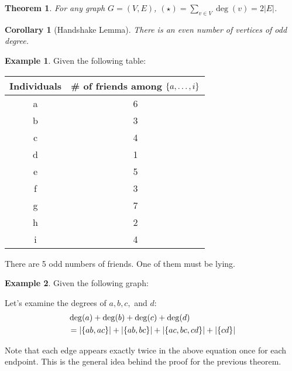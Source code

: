 \documentclass[]{article}
\newtheorem*{theorem}{Theorem}
\newtheorem*{corollary}{Corollary}
\theoremstyle{definition}
\newtheorem{ex}{Example}[section]
\newcommand{\lecture}[1]{\marginpar{{\footnotesize $\leftarrow$ \underline{#1}}}}
\DeclarePairedDelimiter{\set}{\lbrace}{\rbrace}
\begin{document}
			\begin{theorem}
				For any graph $G = (V, E)$, $(\star) = \displaystyle \sum_{v \in V} \deg(v) = 2|E|$.
			\end{theorem}

			\begin{corollary}[Handshake Lemma]
				There is an even number of vertices of odd degree.
			\end{corollary}

			\begin{ex} Given the following table:
				\begin{center}
					\begin{tabular}{c|c}
						Individuals & \# of friends among $\set{a, \ldots, i}$ \\ \hline
						a & 6 \\
						b & 3 \\
						c & 4 \\
						d & 1 \\
						e & 5 \\
						f & 3 \\
						g & 7 \\
						h & 2 \\
						i & 4
					\end{tabular}
				\end{center}

				There are 5 odd numbers of friends. One of them must be lying.
			\end{ex}

			\lecture{February 25, 2013}
			\begin{ex}
				Given the following graph:
				\begin{center}
				\end{center}

				Let's examine the degrees of $a, b, c,$ and $d$:
				\begin{align*}
					&\deg(a) + \deg(b) + \deg(c) + \deg(d) \\
					&= |\set{ab, ac}| + |\set{ab, bc}| + |\set{ac, bc, cd}| + |\set{cd}|
				\end{align*}

				Note that each edge appears exactly twice in the above equation \textendash{} once for each endpoint. This is the general idea behind the proof for the previous theorem.
			\end{ex}
\end{document}
